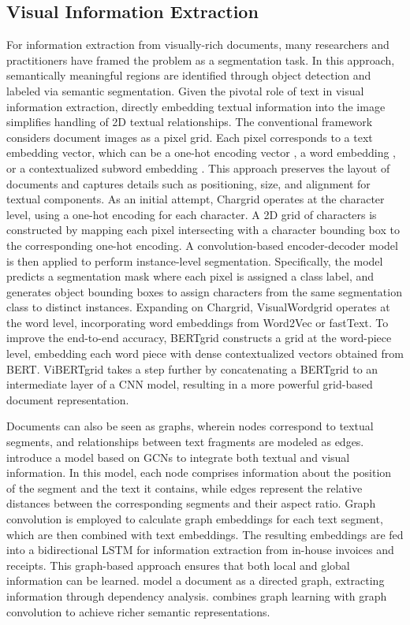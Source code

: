 \subsection{Visual Information Extraction} 

For information extraction from visually-rich documents, many researchers and practitioners have framed the problem as a segmentation task. In this approach, semantically meaningful regions are identified through object detection and labeled via semantic segmentation. Given the pivotal role of text in visual information extraction, directly embedding textual information into the image simplifies handling of 2D textual relationships. The conventional framework considers document images as a pixel grid. Each pixel corresponds to a text embedding vector, which can be a one-hot encoding vector \citep{katti2018chargrid}, a word embedding \citep{kerroumi2021visualwordgrid}, or a contextualized subword embedding \citep{denk2019bertgrid}. This approach preserves the layout of documents and captures details such as positioning, size, and alignment for textual components. As an initial attempt, Chargrid \citep{katti2018chargrid} operates at the character level, using a one-hot encoding for each character. A 2D grid of characters is constructed by mapping each pixel intersecting with a character bounding box to the corresponding one-hot encoding. A convolution-based encoder-decoder model is then applied to perform instance-level segmentation. Specifically, the model predicts a segmentation mask where each pixel is assigned a class label, and generates object bounding boxes to assign characters from the same segmentation class to distinct instances. Expanding on Chargrid, VisualWordgrid \citep{kerroumi2021visualwordgrid} operates at the word level, incorporating word embeddings from Word2Vec or fastText. To improve the end-to-end accuracy, BERTgrid \citep{denk2019bertgrid} constructs a grid at the word-piece level, embedding each word piece with dense contextualized vectors obtained from \ac{BERT}. ViBERTgrid \citep{lin2021vibertgrid} takes a step further by concatenating a BERTgrid to an intermediate layer of a \ac{CNN} model, resulting in a more powerful grid-based document representation. 

Documents can also be seen as graphs, wherein nodes correspond to textual segments, and relationships between text fragments are modeled as edges. \citet{liu2019graph} introduce a model based on \acp{GCN} to integrate both textual and visual information. In this model, each node comprises information about the position of the segment and the text it contains, while edges represent the relative distances between the corresponding segments and their aspect ratio. Graph convolution is employed to calculate graph embeddings for each text segment, which are then combined with text embeddings. The resulting embeddings are fed into a bidirectional \ac{LSTM} for information extraction from in-house invoices and receipts. This graph-based approach ensures that both local and global information can be learned. \citet{hwang2020spatial} model a document as a directed graph, extracting information through dependency analysis. \citet{yu2021pick} combines graph learning with graph convolution to achieve richer semantic representations.

